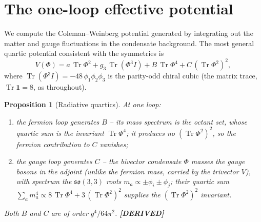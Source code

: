 \documentclass[11pt,oneside]{book}
\newcommand{\Tr}{\operatorname{Tr}}
\newcommand{\so}{\mathfrak{so}}
\newcommand{\status}[1]{{\sffamily\bfseries\color{statuscol}[#1]}}
\theoremstyle{plain}
\newtheorem{proposition}[theorem]{Proposition}
\theoremstyle{definition}
\theoremstyle{remark}
\begin{document}
\section{The one-loop effective potential}
\label{sec:potential}

We compute the Coleman--Weinberg potential \cite{ColemanWeinberg1973} generated by
integrating out the matter and gauge fluctuations in the condensate background. The
most general quartic potential consistent with the symmetries is
\[
  V(\Phi)=a\,\Tr\Phi^2+g_3\,\Tr(\Phi^3 I)+B\,\Tr\Phi^4+C\,(\Tr\Phi^2)^2,
\]
where $\Tr(\Phi^3 I)=-48\,\phi_1\phi_2\phi_3$ is the parity-odd chiral cubic
(the matrix trace, $\Tr\mathbf 1=8$, as throughout).

\begin{proposition}[Radiative quartics]
\label{prop:quartics}
At one loop:
\begin{enumerate}[itemsep=1pt]
\item the \emph{fermion} loop generates $B$ -- its mass spectrum is the octant set,
whose quartic sum is the invariant $\Tr\Phi^4$; it produces \emph{no}
$(\Tr\Phi^2)^2$, so the fermion contribution to $C$ vanishes;
\item the \emph{gauge} loop generates $C$ -- the bivector condensate $\Phi$
masses the gauge bosons in the adjoint (unlike the fermion mass, carried by the
trivector $V$), with spectrum the $\so(3,3)$ roots $m_a\propto\pm\phi_i\pm\phi_j$;
their quartic sum $\sum_a m_a^4\propto 8\,\Tr\Phi^4+3\,(\Tr\Phi^2)^2$ supplies the
$(\Tr\Phi^2)^2$ invariant.
\end{enumerate}
Both $B$ and $C$ are of order $g^4/64\pi^2$. \status{DERIVED}
\end{proposition}
\end{document}
